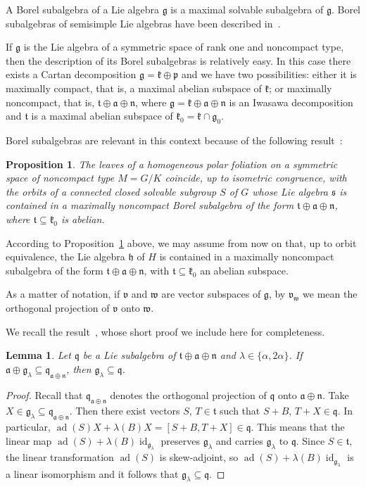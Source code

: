 \documentclass[12pt, a4paper]{amsart}
\newcommand{\g}{\mathfrak}
\newcommand{\ad}{\operatorname{ad}}
\newcommand{\id}{\operatorname{id}}
\newtheorem{lemma}[theorem]{Lemma}
\newtheorem{proposition}[theorem]{Proposition}
\theoremstyle{definition}
\begin{document}
A Borel subalgebra of a Lie algebra $\g{g}$ is a maximal solvable subalgebra of $\g{g}$.
Borel subalgebras of semisimple Lie algebras have been described in~\cite{Mostow}.

If $\g{g}$ is the Lie algebra of a symmetric space of rank one and noncompact type, 
then the description of its Borel subalgebras is relatively easy.
In this case there exists a Cartan decomposition $\g{g}=\g{k}\oplus\g{p}$ and we have two possibilities:
either it is maximally compact, that is, a maximal abelian subspace of $\g{k}$; 
or maximally noncompact, that is, $\g{t}\oplus\g{a}\oplus\g{n}$, 
where $\g{g}=\g{k}\oplus\g{a}\oplus\g{n}$ is an Iwasawa decomposition and $\g{t}$ is a maximal abelian subspace of
$\g{k}_0=\g{k}\cap\g{g}_0$.

Borel subalgebras are relevant in this context because of the following result~\cite[Proposition~4.2]{DiazLorenzo}:

\begin{proposition}\label{th:Borel:tan}
The leaves of a homogeneous polar foliation on a symmetric space of noncompact type $M=G/K$ coincide, up to isometric congruence, with the orbits of a connected closed solvable subgroup $S$ of $G$ whose Lie algebra $\g{s}$ is contained in a maximally noncompact Borel subalgebra of the form $\g{t}\oplus\g{a}\oplus\g{n}$, where $\g{t}\subseteq \g{k}_{0}$ is abelian.
\end{proposition}

According to Proposition~\ref{th:Borel:tan} above, we may assume from now on that, up to orbit equivalence, the Lie algebra $\g{h}$ of $H$ is contained in a maximally noncompact subalgebra of the form $\g{t}\oplus\g{a}\oplus\g{n}$, with $\g{t}\subseteq \g{k}_0$ an abelian subspace.

As a matter of notation, if $\g{v}$ and $\g{w}$ are vector subspaces of $\g{g}$, 
by $\g{v}_{\g{w}}$ we mean the orthogonal projection of $\g{v}$ onto $\g{w}$.

We recall the result~\cite[Lemma~4.3]{DiazLorenzo}, whose short proof we include here for completeness.

\begin{lemma}\label{lemma:projectionImpliesContained}
Let $\g{q}$ be a Lie subalgebra of $\g{t}\oplus\g{a}\oplus\g{n}$
and $\lambda\in\{\alpha,2\alpha\}$.
If $\g{a}\oplus\g{g}_{\lambda}\subseteq \g{q}_{\g{a}\oplus\g{n}}$, 
then $\g{g}_{\lambda}\subseteq \g{q}$.
\end{lemma}

\begin{proof}
Recall that $\g{q}_{\g{a}\oplus\g{n}}$ denotes the orthogonal projection of $\g{q}$ onto $\g{a}\oplus\g{n}$.
Take $X\in\g{g}_{\lambda}\subseteq\g{q}_{\g{a}\oplus\g{n}}$. 
Then there exist vectors $S$, $T\in\g{t}$ such that $S+B$, $T+X\in\g{q}$. 
In particular, $\ad(S)X+\lambda(B)X=[S+B,T+X]\in\g{q}$. 
This means that the linear map $\ad(S)+\lambda(B)\id_{\g{g}_{\lambda}}$ preserves $\g{g}_{\lambda}$ 
and carries $\g{g}_{\lambda}$ to $\g{q}$. 
Since $S\in\g{t}$, the linear transformation $\ad(S)$ is skew-adjoint, so $\ad(S)+\lambda(B)\id_{\g{g}_{\lambda}}$ is a linear isomorphism and it follows that $\g{g}_{\lambda}\subseteq \g{q}$.
\end{proof}
\end{document}

